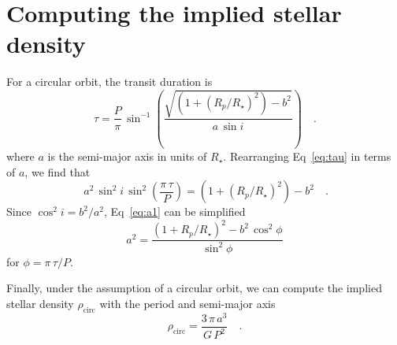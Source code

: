 \documentclass[floatfix,ApJL,twocolumn]{aastex631}
\begin{document}
\vspace{5mm}



{}


\appendix

\section{Computing the implied stellar density}\label{apdx:stellar_density}
For a circular orbit, the transit duration is \citep{Winn:2010:arXiv}
\begin{equation}~\label{eq:tau}
  \tau = \frac{P}{\pi}\,\sin^{-1}\left( \frac{\sqrt{(1 + (R_{p}/R_{\star})^2) - b^2}}{a\,\sin i} \right) \quad. \,
\end{equation}
where $a$ is the semi-major axis in units of $R_\star$.
Rearranging Eq~\ref{eq:tau} in terms of $a$, we find that
\begin{equation}~\label{eq:a1}
  a^2\,\sin^2 i\,\sin^2\left(\frac{\pi\,\tau}{P}\right) = (1 + (R_{p}/R_{\star})^2) - b^2 \quad.
\end{equation}
Since $\cos^2 i = b^2 / a^2$, Eq~\ref{eq:a1} can be simplified
\begin{equation}
  a^2 = \frac{(1 + R_{p}/R_{\star})^2 - b^2\,\cos^2\phi}{\sin^2\phi}
\end{equation}
for $\phi = \pi\,\tau / P$.

Finally, under the assumption of a circular orbit, we can compute the implied stellar density $\rho_\mathrm{circ}$ with the period and semi-major axis
\begin{equation}
  \rho_\mathrm{circ} = \frac{3\,\pi\,a^3}{G\,P^2} \quad.
\end{equation}
\end{document}
